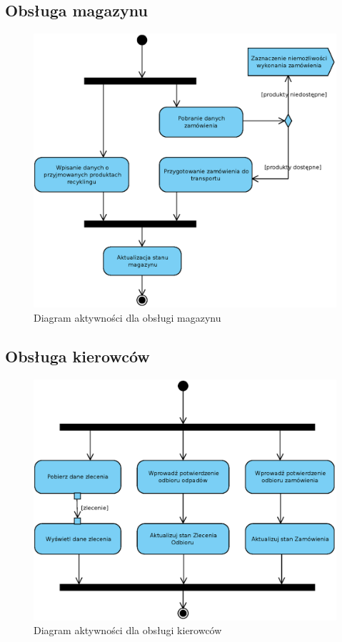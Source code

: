 \subsection{Obsługa magazynu}
	\begin{figure}[H]
		\centering
		\includegraphics[width=.9\textwidth]{img/AD/magazyn.eps}
		\caption{Diagram aktywności dla obsługi magazynu}
	\end{figure}

\subsection{Obsługa kierowców}
	\begin{figure}[H]
		\centering
		\includegraphics[width=.9\textwidth]{img/AD/kierowca.eps}
		\caption{Diagram aktywności dla obsługi kierowców}
	\end{figure}